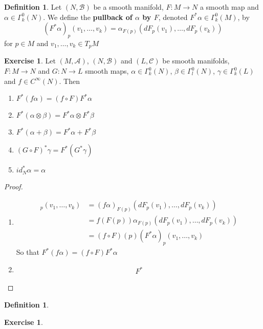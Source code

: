 \documentclass[12pt]{amsart}
\theoremstyle{definition}
\newtheorem{defn}[definition]{Definition}
\newtheorem{ex}[definition]{Exercise}
\newcommand{\al}{\alpha}
\newcommand{\gam}{\gamma}
\newcommand{\Gam}{\Gamma}
\newcommand{\bet}{\beta}
\newcommand{\MA}{\mathcal{A}}
\newcommand{\MC}{\mathcal{C}}
\newcommand{\MB}{\mathcal{B}}
\begin{document}
	\begin{defn}
	Let $(N, \MB)$ be a smooth manifold, $F:M \rightarrow N$ a smooth map and $\al \in \Gam^0_k(N)$. We define the \textbf{pullback of $\al$ by $F$}, denoted $F^*\al \in \Gam^0_k(M)$, by  $$(F^*\al)_p(v_1, \dots, v_k) = \al_{F(p)} (dF_p(v_1), \dots, dF_p(v_k))$$ for $p \in M$ and $v_1, \dots, v_k \in T_pM$
	\end{defn}

	\begin{ex}
	Let $(M, \MA)$, $(N, \MB)$ and $(L, \MC)$ be smooth manifolds, $F:M \rightarrow N$ and $G:N \rightarrow L$ smooth maps, $\al \in \Gam^0_k(N)$, $\bet  \in \Gam^0_l(N)$, $\gam \in \Gam^0_k(L)$ and $f \in C^{\infty}(N)$. Then 
	\begin{enumerate}
	\item $F^*(f \al) = (f \circ F) F^* \al$
	\item $F^*(\al \otimes \bet) = F^*\al \otimes F^* \bet$
	\item $F^*(\al + \bet) = F^* \al + F^* \bet $
	\item $(G \circ F)^*\gam = F^*(G^* \gam)$
	\item $id_N^* \al = \al$
	\end{enumerate}
	\end{ex}
	
	\begin{proof}\
	\begin{enumerate}
	\item 
	\begin{align*}
	[F^*(f \al)]_p(v_1, \dots, v_k) 
	&= (f \al )_{F(p)}(dF_p(v_1), \dots, dF_p(v_k)) \\
	&= f (F(p)) \al_{F(p)} (dF_p(v_1), \dots, dF_p(v_k)) \\
	&= (f \circ F)(p) (F^*\al)_p(v_1, \dots, v_k)
	\end{align*}
	So that $F^*(f \al) = (f \circ F) F^* \al$
	\item 
	\begin{align*}
		F^*
	\end{align*}
	\end{enumerate}
	
	\end{proof}
	
	
	
	
	
	\begin{defn}
	
	\end{defn}

	
	\begin{ex}
	
	\end{ex}
	
\end{document}
